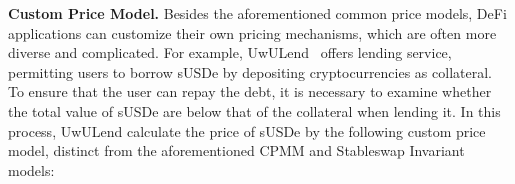 \noindent\textbf{Custom Price Model.}
Besides the aforementioned common price models, DeFi applications can customize their own pricing mechanisms, which are often more diverse and complicated. 
For example, 
%
UwULend~\cite{uwulend_official} offers lending service, permitting users to borrow sUSDe by depositing cryptocurrencies as collateral. 
To ensure that the user can repay the debt, it is necessary to examine whether the total value of sUSDe are below that of the collateral when lending it.
In this process, UwULend calculate the price of sUSDe by the following custom price model, distinct from the aforementioned CPMM and Stableswap Invariant models:
